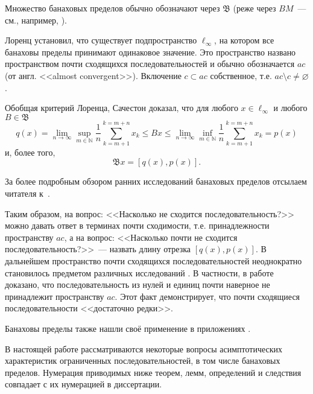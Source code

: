 Множество банаховых пределов обычно обозначают через $\mathfrak{B}$
(реже через $BM$~--- см., например, \cite{alekhno2012superposition,alekhno2015banach}).

Лоренц \cite{lorentz1948contribution} установил, что существует подпространство $\ell_\infty$,
на котором все банаховы пределы принимают одинаковое значение.
Это пространство названо пространством почти сходящихся последовательностей и обычно обозначается $ac$
(от англ. <<almost convergent>>).
Включение $c \subset ac$ собственное, т.е. $ac \setminus c \neq \varnothing$.


Обобщая критерий Лоренца, Сачестон \cite{sucheston1967banach} доказал, что для любого $x\in\ell_\infty$
и любого $B\in\mathfrak{B}$
\begin{equation*}
	q(x) =
	\lim_{n\to\infty} \sup_{m\in\mathbb{N}} \frac{1}{n} \sum_{k=m+1}^{k=m+n} x_k
	\leq
	Bx
	\leq
	\lim_{n\to\infty} \inf_{m\in\mathbb{N}} \frac{1}{n} \sum_{k=m+1}^{k=m+n} x_k
	= p(x)
\end{equation*}
и, более того,
\begin{equation*}
	\mathfrak{B}x = [q(x), p(x)]
	.
\end{equation*}

За более подробным обзором ранних исследований банаховых пределов отсылаем читателя к~\cite{day1973normed,greenleaf1969invariant}.

Таким образом, на вопрос: <<Насколько не сходится последовательность?>> %
можно давать ответ в терминах почти сходимости, т.е. принадлежности пространству $ac$,
а на вопрос: <<Насколько почти не сходится последовательность?>>~---
назвать длину отрезка $[q(x), p(x)]$.
В дальнейшем пространство почти сходящихся последовательностей неоднократно становилось предметом
различных исследований
\cite{semenov2006space,usachev2008transformations}.
В частности, в работе~\cite{connor1990almost} доказано,
что последовательность из нулей и единиц почти наверное не принадлежит пространству $ac$.
Этот факт демонстрирует, что почти сходящиеся последовательности <<достаточно редки>>.


Банаховы пределы также нашли своё применение в приложениях
\cite{semenov2015banachtraces,semenov2009fourier,strukova2015spectres}.



В настоящей работе рассматриваются некоторые вопросы асимптотических характеристик ограниченных последовательностей,
в том числе банаховых пределов.
Нумерация приводимых ниже теорем, лемм, определений и следствия совпадает с их нумерацией в диссертации.


